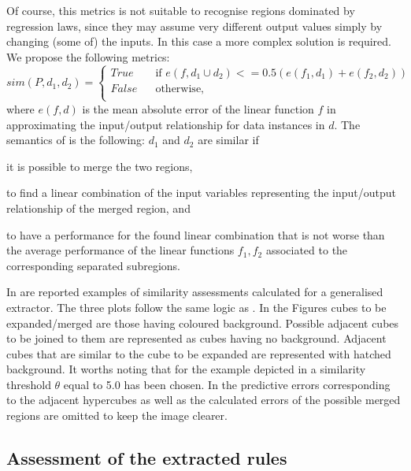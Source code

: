 \documentclass[
]{ceurart}
\begin{document}
Of course, this metrics is not suitable to recognise regions dominated by regression laws, since they may assume very different output values simply by changing (some of) the inputs.
%
In this case a more complex solution is required.
%
We propose the following metrics:
\begin{equation}
	sim(P, d_1, d_2) = 
	\begin{cases}
		True \text{~~~~~~if~} e(f, d_1 \cup d_2) <= 0.5 (e(f_1, d_1) + e(f_2, d_2))\\
		False \text{~~~~~otherwise,}\\
	\end{cases}\,\label{eq:simRegLin}
\end{equation}
where $e(f, d)$ is the mean absolute error of the linear function $f$ in approximating the input/output relationship for data instances in $d$.
%
The semantics of  is the following: $d_1$ and $d_2$ are similar if
\begin{inlinelist}
	\item it is possible to merge the two regions,
	\item to find a linear combination of the input variables representing the input/output relationship of the merged region, and
	\item to have a performance for the found linear combination that is not worse than the average performance of the linear functions $f_1, f_2$ associated to the corresponding separated subregions.
\end{inlinelist}



In  are reported examples of similarity assessments calculated for a generalised extractor.
%
The three plots follow the same logic as .
%
In the Figures cubes to be expanded/merged are those having coloured background.
%
Possible adjacent cubes to be joined to them are represented as cubes having no background.
%
Adjacent cubes that are similar to the cube to be expanded are represented with hatched background.
%
It worths noting that for the example depicted in  a similarity threshold $\theta$ equal to 5.0 has been chosen.
%
In  the predictive errors corresponding to the adjacent hypercubes as well as the calculated errors of the possible merged regions are omitted to keep the image clearer.

\subsection{Assessment of the extracted rules}
\end{document}
